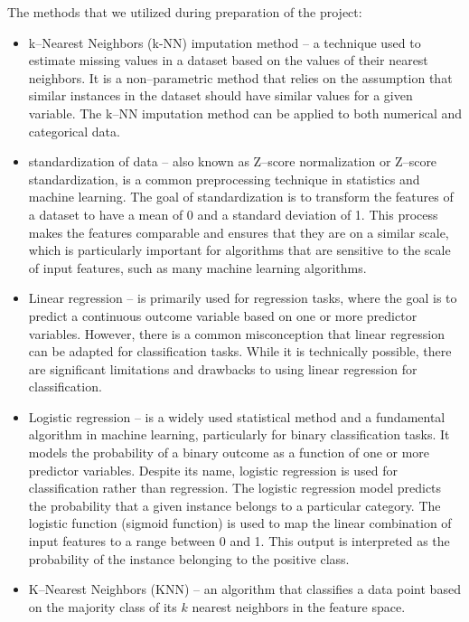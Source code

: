 \documentclass[11pt,a4paper]{article}\usepackage[]{graphicx}\usepackage[]{xcolor}
\begin{document}
	
	The methods that we utilized during preparation of the project:
	\begin{itemize}
	\item k--Nearest Neighbors (k-NN) imputation method -- a technique used to estimate missing values in a dataset based on the values of their nearest neighbors. It is a non--parametric method that relies on the assumption that similar instances in the dataset should have similar values for a given variable. The k--NN imputation method can be applied to both numerical and categorical data.
	\item  standardization of data -- also known as Z--score normalization or Z--score standardization, is a common preprocessing technique in statistics and machine learning. The goal of standardization is to transform the features of a dataset to have a mean of 0 and a standard deviation of 1. This process makes the features comparable and ensures that they are on a similar scale, which is particularly important for algorithms that are sensitive to the scale of input features, such as many machine learning algorithms.

		\item Linear regression -- is primarily used for regression tasks, where the goal is to predict a continuous outcome variable based on one or more predictor variables. However, there is a common misconception that linear regression can be adapted for classification tasks. While it is technically possible, there are significant limitations and drawbacks to using linear regression for classification. 
		
	\item Logistic regression -- is a widely used statistical method and a fundamental algorithm in machine learning, particularly for binary classification tasks. It models the probability of a binary outcome as a function of one or more predictor variables. Despite its name, logistic regression is used for classification rather than regression. The logistic regression model predicts the probability that a given instance belongs to a particular category. The logistic function (sigmoid function) is used to map the linear combination of input features to a range between 0 and 1. This output is interpreted as the probability of the instance belonging to the positive class.
	
	\item K--Nearest Neighbors (KNN) -- an algorithm that classifies a data point based on the majority class of its $k$ nearest neighbors in the feature space. 
	

\end{itemize}
\end{document}
